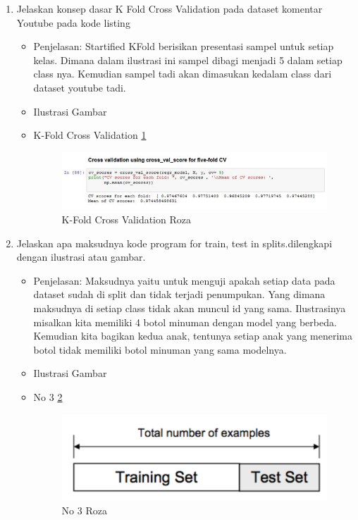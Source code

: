 \begin{enumerate}
\item Jelaskan konsep dasar K Fold Cross Validation pada dataset komentar Youtube pada kode listing 

\begin{itemize}
\item Penjelasan: Startified KFold berisikan presentasi sampel untuk setiap kelas. Dimana dalam ilustrasi ini sampel dibagi menjadi 5 dalam setiap class nya. Kemudian sampel tadi akan dimasukan kedalam class dari dataset youtube tadi.
\par 
\par
\item Ilustrasi Gambar
\item K-Fold Cross Validation \ref{teori2}
\begin{figure}[!hbtp]
\centering
\includegraphics[scale=0.7]{figures/teori2.jpg}
\caption{K-Fold Cross Validation Roza}
\label{teori2}
\end{figure}
\par
\end{itemize}
\par
\par

\item Jelaskan apa maksudnya kode program for train, test in splits.dilengkapi dengan ilustrasi atau gambar.
\begin{itemize}
\item Penjelasan: Maksudnya yaitu untuk menguji apakah setiap data pada dataset sudah di split dan tidak terjadi penumpukan. Yang dimana maksudnya di setiap class tidak akan muncul id yang sama. Ilustrasinya misalkan kita memiliki 4 botol minuman dengan model yang berbeda. Kemudian kita bagikan kedua anak, tentunya setiap anak yang menerima botol tidak memiliki botol minuman  yang sama modelnya.
\par 
\par
\item Ilustrasi Gambar
\item No 3  \ref{teori3}
\begin{figure}[!hbtp]
\centering
\includegraphics[scale=0.2]{figures/teori3.png}
\caption{No 3 Roza}
\label{teori3}
\end{figure}
\par
\end{itemize}
\par
\par


\end{enumerate}
